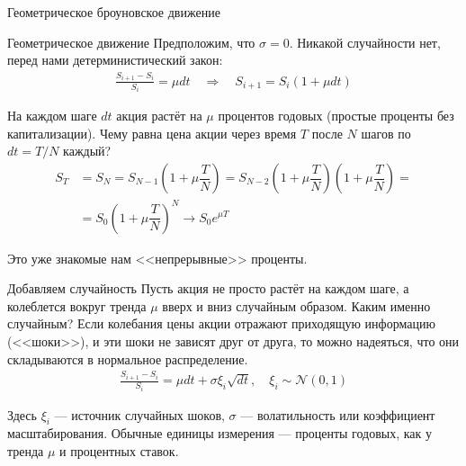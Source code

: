\documentclass{beamer}
\begin{document}
\begin{frame}{Геометрическое броуновское движение}
\centering
{}
\end{frame}



\begin{frame}{Геометрическое движение}
\justify
Предположим, что $\sigma=0$. Никакой случайности нет, перед нами детерминистический закон:
\begin{align*}
\frac{S_{i+1} - S_i}{S_i} = \mu dt \quad \Rightarrow \quad S_{i+1} = S_i(1 + \mu dt)
\end{align*}

\justify
На каждом шаге $dt$ акция растёт на $\mu$ процентов годовых (простые проценты без капитализации). Чему равна цена акции через время $T$ после $N$ шагов по $dt=T/N$ каждый?
\begin{align*}
S_T &= S_N = S_{N-1}\left(1+\mu\dfrac{T}{N}\right) 
= S_{N-2}\left(1+\mu\dfrac{T}{N}\right)\left(1+\mu\dfrac{T}{N}\right) = \\
&= S_0\left(1+\mu\dfrac{T}{N}\right)^N \to S_0e^{\mu T}
\end{align*}

\justify
Это уже знакомые нам <<непрерывные>> проценты.
\end{frame}



\begin{frame}{Добавляем случайность}
\justify
Пусть акция не просто растёт на каждом шаге, а колеблется вокруг тренда $\mu$ вверх и 
вниз случайным образом. Каким именно случайным? Если колебания цены акции отражают
приходящую информацию (<<шоки>>), и эти шоки не зависят друг от друга, то можно 
надеяться, что они складываются в нормальное распределение.
\begin{align*}
\frac{S_{i+1} - S_i}{S_i} = \mu dt + \sigma\xi_i\sqrt{dt}, \quad \xi_i \sim \mathcal{N}(0, 1)
\end{align*}

Здесь $\xi_i$ --- источник случайных шоков, $\sigma$ --- волатильность или коэффициент масштабирования. Обычные единицы измерения --- проценты годовых, как у тренда $\mu$ и процентных ставок.
\end{frame}
\end{document}
